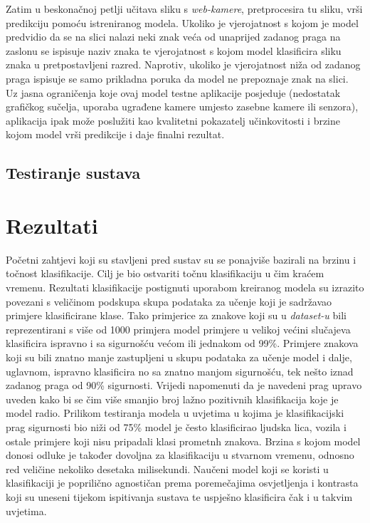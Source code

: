 \documentclass[times, utf8, zavrsni]{fer}
\begin{document}
Zatim u beskonačnoj petlji učitava sliku s \emph{web-kamere}, pretprocesira tu sliku, vrši predikciju pomoću istreniranog modela. Ukoliko je vjerojatnost s kojom je model predvidio da se na slici nalazi neki znak veća od unaprijed zadanog praga na zaslonu se ispisuje naziv
znaka te vjerojatnost s kojom model klasificira sliku znaka u pretpostavljeni razred. Naprotiv, ukoliko je vjerojatnost niža od zadanog praga ispisuje se samo prikladna poruka da model ne prepoznaje znak na slici.
\\Uz jasna ograničenja koje ovaj model testne aplikacije posjeduje (nedostatak grafičkog sučelja, uporaba ugrađene kamere umjesto zasebne kamere ili senzora), aplikacija ipak može poslužiti kao kvalitetni pokazatelj učinkovitosti i brzine kojom model vrši predikcije i daje finalni rezultat. 


\section{Testiranje sustava}

\chapter{Rezultati}
Početni zahtjevi koji su stavljeni pred sustav su se ponajviše bazirali na brzinu i točnost klasifikacije. Cilj je bio ostvariti točnu klasifikaciju u čim kraćem vremenu.
Rezultati klasifikacije postignuti uporabom kreiranog modela su izrazito povezani s veličinom podskupa skupa podataka za učenje koji je sadržavao primjere klasificirane klase. Tako primjerice za znakove koji su u \emph{dataset-u} bili reprezentirani s više od 1000 primjera model primjere 
u velikoj većini slučajeva klasificira ispravno i sa sigurnošću većom ili jednakom od 99\%. Primjere znakova koji su bili znatno manje zastupljeni u skupu podataka za učenje model i dalje, uglavnom, ispravno klasificira no sa znatno manjom sigurnošću, tek nešto iznad zadanog praga od 90\% sigurnosti.
Vrijedi napomenuti da je navedeni prag upravo uveden kako bi se čim više smanjio broj lažno pozitivnih klasifikacija koje je model radio. Prilikom testiranja modela u uvjetima u kojima je klasifikacijski prag sigurnosti bio niži od 75\% model je često klasificirao ljudska lica, vozila i ostale
primjere koji nisu pripadali klasi prometnh znakova. Brzina s kojom model donosi odluke je također dovoljna za klasifikaciju u stvarnom vremenu, odnosno red veličine nekoliko desetaka milisekundi.
Naučeni model koji se koristi u klasifikaciji je poprilično agnostičan prema poremečajima osvjetljenja i kontrasta koji su uneseni tijekom ispitivanja sustava te uspješno klasificira čak i u takvim uvjetima.
\end{document}
